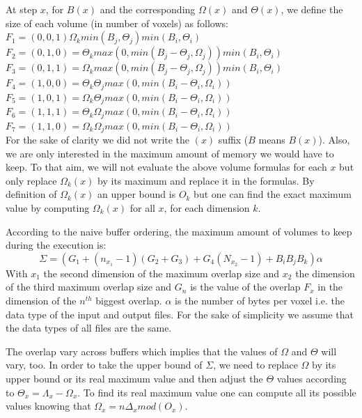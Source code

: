 \documentclass[conference]{IEEEtran}
\begin{document}
  At step $x$, for $B(x)$ and the corresponding $\Omega(x)$ and $\Theta(x)$, we define the size of each volume (in number of voxels) as follows:
  \noindent $F_1 = (0,0,1) \Omega_k min(B_j, \Theta_j) min(B_i, \Theta_i)$ \\
  $F_2 = (0,1,0) = \Theta_k max(0, min(B_j - \Theta_j, \Omega_j)) min(B_i, \Theta_i)$ \\
  $F_3 = (0,1,1) = \Omega_k max(0, min(B_j - \Theta_j, \Omega_j)) min(B_i, \Theta_i)$ \\
  $F_4 = (1,0,0) = \Theta_k \Theta_j max(0, min(B_i-\Theta_i, \Omega_i))$ \\
  $F_5 = (1,0,1) = \Omega_k \Theta_j max(0, min(B_i-\Theta_i, \Omega_i))$ \\
  $F_6 = (1,1,1) = \Theta_k \Omega_j max(0, min(B_i-\Theta_i, \Omega_i))$ \\
  $F_7 = (1,1,0) = \Omega_k \Omega_j max(0, min(B_i-\Theta_i, \Omega_i))$ \\

  For the sake of clarity we did not write the $(x)$ suffix ($B$ means $B(x)$).
  Also, we are only interested in the maximum amount of memory we would have to keep.
  To that aim, we will not evaluate the above volume formulas for each $x$ but only replace $\Omega_k(x)$ by its maximum and replace it in the formulas.
  By definition of $\Omega_k(x)$ an upper bound is $O_k$ but one can find the exact maximum value by computing $\Omega_k(x)$ for all $x$, for each dimension $k$.

  According to the naive buffer ordering, the maximum amount of volumes to keep during the execution is:
  $$\Sigma = (G_1 + (n_{x_1}-1)(G_2 + G_3) + G_4(N_{x_2}-1) + B_iB_jB_k)\alpha$$
  With $x_1$ the second dimension of the maximum overlap size and $x_2$ the dimension of the third maximum overlap size and $G_n$ is the value of the overlap $F_x$ in the dimension of the $n^{th}$ biggest overlap.
  $\alpha$ is the number of bytes per voxel i.e. the data type of the input and output files.
  For the sake of simplicity we assume that the data types of all files are the same.

  The overlap vary across buffers which implies that the values of $\Omega$ and $\Theta$ will vary, too.
  In order to take the upper bound of $\Sigma$, we need to replace $\Omega$ by its upper bound or its real maximum value and then adjust the $\Theta$ values according to $\Theta_x = \Lambda_x - \Omega_x$.
  To find its real maximum value one can compute all its possible values knowing that $\Omega_x = n\Delta_xmod(O_x)$.
\end{document}
